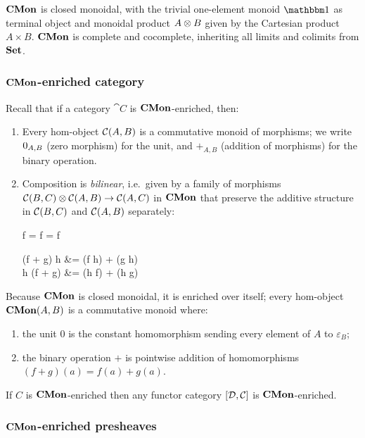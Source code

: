 $\mathbf{CMon}$ is closed monoidal, with the trivial one-element monoid $\One$ as terminal object and monoidal product
$A \otimes B$ given by the Cartesian product $A \times B$. $\mathbf{CMon}$ is complete and cocomplete, inheriting all
limits and colimits from $\mathbf{Set}$.

\subsubsection{$\mathbf{CMon}$-enriched category}

Recall that if a category $\cat{C}$ is $\mathbf{CMon}$-enriched, then:
\begin{enumerate}
\item Every hom-object ${\mathcal{C}}(A,B)$ is a commutative monoid of morphisms; we write $0_{A,B}$
(zero morphism) for the unit, and $+_{A,B}$ (addition of morphisms) for the binary operation.
\item Composition is \emph{bilinear}, i.e.~given by a family of morphisms ${\mathcal{C}}(B,C) \otimes
{\mathcal{C}}(A,B) \to {\mathcal{C}}(A,C)$ in $\mathbf{CMon}$ that preserve the additive structure in
${\mathcal{C}}(B,C)$ and ${\mathcal{C}}(A,B)$ separately:

\begin{salign*}
f \comp \zero = f = \zero \comp f
\end{salign*}
\begin{salign*}
(f + g) \comp h &= (f \comp h) + (g \comp h) \\
h \comp (f + g) &= (h \comp f) + (h \comp g)
\end{salign*}
\end{enumerate}

Because $\mathbf{CMon}$ is closed monoidal, it is enriched over itself; every hom-object ${\mathbf{CMon}}(A,B)$ is a
commutative monoid where:

\begin{enumerate}
\item the unit $0$ is the constant homomorphism sending every element of $A$ to $\varepsilon_B$;
\item the binary operation $+$ is pointwise addition of homomorphisms $(f + g)(a) = f(a) + g(a)$.
\end{enumerate}

\begin{proposition}
If $C$ is $\mathbf{CMon}$-enriched then any functor category $[\mathcal{D},\mathcal{C}]$ is $\mathbf{CMon}$-enriched.
\end{proposition}

\subsubsection{$\mathbf{CMon}$-enriched presheaves}

